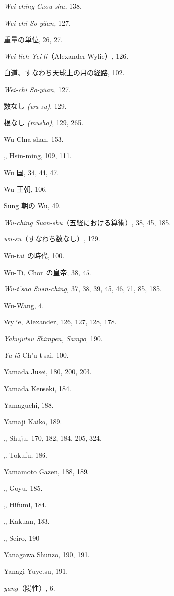 \documentclass[11pt]{article}
\newcommand{\scanpage}[2]{\clearpage\setcounter{footnote}{0}\noindent{\footnotesize\color{gray}PDF #1 頁 · #2}\par\medskip}
\begin{document}
\scanpage{0360}{印刷頁 346}
\emph{Wei-ching Chou-shu,} 138.\par
\emph{Wei-chi So-yüan,} 127.\par
重量の単位, 26, 27.\par
\emph{Wei-lieh Yei-li}（Alexander Wylie）, 126.\par
白道、すなわち天球上の月の経路, 102.\par
\emph{Wei-chi So-yüan,} 127.\par
数なし \emph{(wu-su)}, 129.\par
根なし \emph{(mushō)}, 129, 265.\par
Wu Chia-shan, 153.\par
\quad „ Hsin-ming, 109, 111.\par
Wu 国, 34, 44, 47.\par
Wu 王朝, 106.\par
Sung 朝の Wu, 49.\par
\emph{Wu-ching Suan-shu}（五経における算術）, 38, 45, 185.\par
\emph{wu-su}（すなわち数なし）, 129.\par
Wu-tai の時代, 100.\par
Wu-Ti, Chou の皇帝, 38, 45.\par
\emph{Wu-t'sao Suan-ching,} 37, 38, 39, 45, 46, 71, 85, 185.\par
Wu-Wang, 4.\par
Wylie, Alexander, 126, 127, 128, 178.\par
\medskip
\emph{Yakujutsu Shimpen,} \emph{Sampō,} 190.\par
\emph{Ya-lü} Ch'u-t'sai, 100.\par
Yamada Jusei, 180, 200, 203.\par
Yamada Kenseki, 184.\par
Yamaguchi, 188.\par
Yamaji Kaikō, 189.\par
\quad „ Shuju, 170, 182, 184, 205, 324.\par
\quad „ Tokufu, 186.\par
Yamamoto Gazen, 188, 189.\par
\quad „ Goyu, 185.\par
\quad „ Hifumi, 184.\par
\quad „ Kakuan, 183.\par
\quad „ Seiro, 190\par
Yanagawa Shunzō, 190, 191.\par
Yanagi Yuyetsu, 191.\par
\emph{yang}（陽性）, 6.\par
\end{document}
